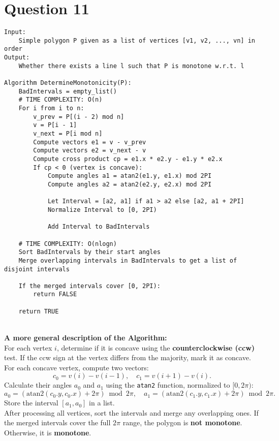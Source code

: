 \documentclass{article}
\begin{document}
\newpage

\section*{Question 11}
\begin{verbatim}
Input: 
    Simple polygon P given as a list of vertices [v1, v2, ..., vn] in order
Output: 
    Whether there exists a line l such that P is monotone w.r.t. l

Algorithm DetermineMonotonicity(P):
    BadIntervals = empty_list()
    # TIME COMPLEXITY: O(n)
    For i from i to n:
        v_prev = P[(i - 2) mod n]
        v = P[i - 1]
        v_next = P[i mod n]
        Compute vectors e1 = v - v_prev
        Compute vectors e2 = v_next - v
        Compute cross product cp = e1.x * e2.y - e1.y * e2.x
        If cp < 0 (vertex is concave):
            Compute angles a1 = atan2(e1.y, e1.x) mod 2PI
            Compute angles a2 = atan2(e2.y, e2.x) mod 2PI

            Let Interval = [a2, a1] if a1 > a2 else [a2, a1 + 2PI]
            Normalize Interval to [0, 2PI)

            Add Interval to BadIntervals

    # TIME COMPLEXITY: O(nlogn)
    Sort BadIntervals by their start angles
    Merge overlapping intervals in BadIntervals to get a list of disjoint intervals

    If the merged intervals cover [0, 2PI):
        return FALSE

    return TRUE
\end{verbatim}
\\
\textbf{A more general description of the Algorithm: }
\\
For each vertex \(i\), determine if it is concave using the \textbf{counterclockwise (ccw)} test. If the ccw sign at the vertex differs from the majority, mark it as concave. For each concave vertex, compute two vectors:
\[
    c_0 = v(i) - v(i-1), \quad c_1 = v(i+1) - v(i).
\]
Calculate their angles \(a_0\) and \(a_1\) using the \texttt{atan2} function, normalized to \([0, 2\pi)\):
\[
    a_0 = (\text{atan2}(c_0.y, c_0.x) + 2\pi) \bmod 2\pi, \quad a_1 = (\text{atan2}(c_1.y, c_1.x) + 2\pi) \bmod 2\pi.
\]
Store the interval \([a_1, a_0]\) in a list.
\\
After processing all vertices, sort the intervals and merge any overlapping ones. If the merged intervals cover the full \(2\pi\) range, the polygon is \textbf{not monotone}. Otherwise, it is \textbf{monotone}.
\newpage
\end{document}
